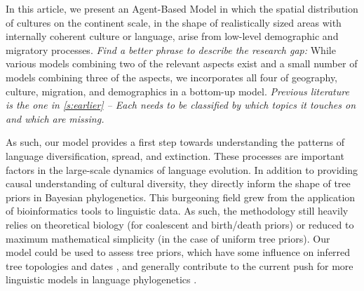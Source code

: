 \documentclass[a4paper,12pt]{scrartcl}
\begin{document}
In this article, we present an Agent-Based Model in which the spatial
distribution of cultures on the continent scale, in the shape of realistically
sized areas with internally coherent culture or language, arise from low-level
demographic and migratory processes. \emph{Find a better phrase to describe the
  research gap:} While various models combining two of the relevant aspects
exist and a small number of models combining three of the aspects, we
incorporates all four of geography, culture, migration, and demographics in a
bottom-up model. \emph{Previous literature is the one in \cref{s:earlier} – Each
  needs to be classified by which topics it touches on and which are missing.}

As such, our model provides a first step towards understanding the patterns of
language diversification, spread, and extinction. These processes are important
factors in the large-scale dynamics of language evolution. In addition to
providing causal understanding of cultural diversity, they directly inform the
shape of tree priors in Bayesian phylogenetics. This burgeoning field
\parencite{jager,bouckaert,gray,sino-tibetan} grew from the application of
bioinformatics tools to linguistic data. As such, the methodology still heavily
relies on theoretical biology (for coalescent and birth/death priors) or reduced
to maximum mathematical simplicity (in the case of uniform tree priors). Our
model could be used to assess tree priors, which have some influence on inferred
tree topologies and dates \cite{rama2018three}, and generally contribute to the
current push for more linguistic models in language phylogenetics
\parencite{stochasticdollo,dollowithlateraltransfers,neureiter,maurits-rakes,kaiping-tap}.
\end{document}
